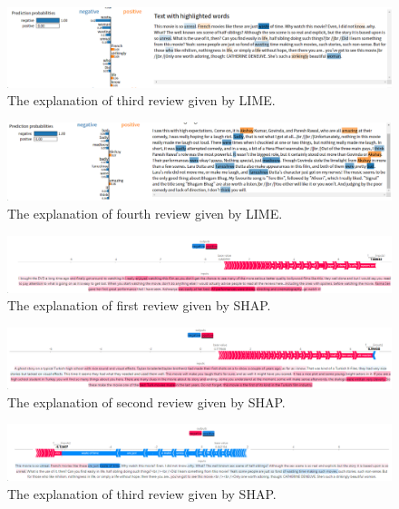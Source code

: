 \documentclass{article}[12pt]
\begin{document}
\begin{figure}[htbp]
	\centering
	\includegraphics[width=\linewidth]{figure/lime-imdb-3}
	\caption{The explanation of third review given by LIME.}
	\label{fig:lime-imdb-3}
\end{figure}

\begin{figure}[htbp]
	\centering
	\includegraphics[width=\linewidth]{figure/lime-imdb-4}
	\caption{The explanation of fourth review given by LIME.}
	\label{fig:lime-imdb-4}
\end{figure}

\begin{figure}[htbp]
	\centering
	\includegraphics[width=\linewidth]{figure/shap-imdb-1}
	\caption{The explanation of first review given by SHAP.}
	\label{fig:shap-imdb-1}
\end{figure}

\begin{figure}[htbp]
	\centering
	\includegraphics[width=\linewidth]{figure/shap-imdb-2}
	\caption{The explanation of second review given by SHAP.}
	\label{fig:shap-imdb-2}
\end{figure}

\begin{figure}[htbp]
	\centering
	\includegraphics[width=\linewidth]{figure/shap-imdb-3}
	\caption{The explanation of third review given by SHAP.}
	\label{fig:shap-imdb-3}
\end{figure}
\end{document}
